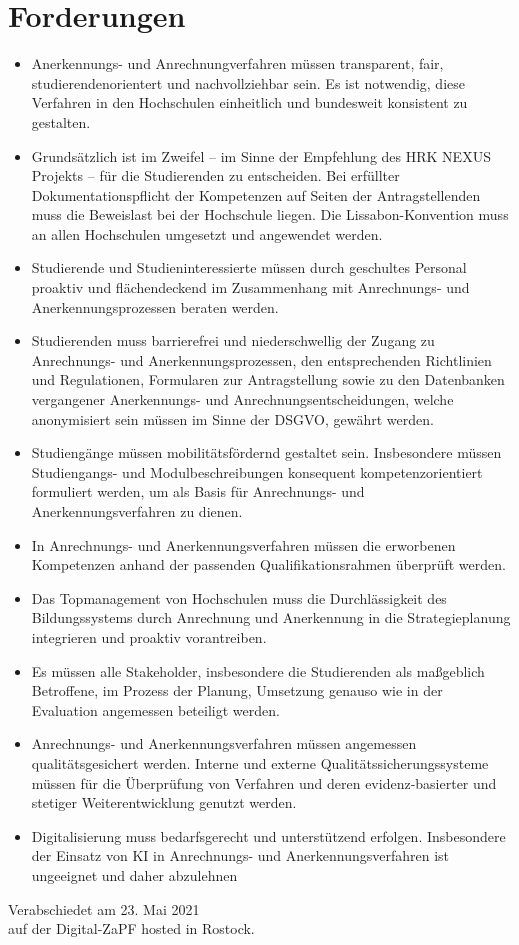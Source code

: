 \documentclass[DIV=calc]{scrartcl}
\begin{document}
\section*{Forderungen}

\begin{itemize}
    \item Anerkennungs- und Anrechnungverfahren müssen transparent, fair, studierendenorientert und nachvollziehbar sein. Es ist notwendig, diese Verfahren in den Hochschulen einheitlich und bundesweit konsistent zu gestalten.
    \item Grundsätzlich ist im Zweifel – im Sinne der Empfehlung des HRK NEXUS Projekts – für die Studierenden zu entscheiden. Bei erfüllter Dokumentationspflicht der Kompetenzen auf Seiten der Antragstellenden muss die Beweislast bei der Hochschule liegen. Die Lissabon-Konvention muss an allen Hochschulen umgesetzt und angewendet werden.
    \item Studierende und Studieninteressierte müssen durch geschultes Personal proaktiv und flächendeckend im Zusammenhang mit Anrechnungs- und Anerkennungsprozessen beraten werden.
    \item Studierenden muss barrierefrei und niederschwellig der Zugang zu Anrechnungs- und Anerkennungsprozessen, den entsprechenden Richtlinien und Regulationen, Formularen zur Antragstellung sowie zu den Datenbanken vergangener Anerkennungs- und Anrechnungsentscheidungen, welche anonymisiert sein müssen im Sinne der DSGVO, gewährt werden.
    \item Studiengänge müssen mobilitätsfördernd gestaltet sein. Insbesondere müssen Studiengangs- und Modulbeschreibungen konsequent kompetenzorientiert formuliert werden, um als Basis für Anrechnungs- und Anerkennungsverfahren zu dienen.
    \item In Anrechnungs- und Anerkennungsverfahren müssen die erworbenen Kompetenzen anhand der passenden Qualifikationsrahmen überprüft werden.
    \item Das Topmanagement von Hochschulen muss die Durchlässigkeit des Bildungssystems durch Anrechnung und Anerkennung in die Strategieplanung integrieren und proaktiv vorantreiben.
    \newpage
    \item Es müssen alle Stakeholder, insbesondere die Studierenden als maßgeblich Betroffene, im Prozess der Planung, Umsetzung genauso wie in der Evaluation angemessen beteiligt werden.
    \item Anrechnungs- und Anerkennungsverfahren müssen angemessen qualitätsgesichert werden. Interne und externe Qualitätssicherungssysteme müssen für die Überprüfung von Verfahren und deren evidenz-basierter und stetiger Weiterentwicklung genutzt werden.
    \item Digitalisierung muss bedarfsgerecht und unterstützend erfolgen. Insbesondere der Einsatz von KI in Anrechnungs- und Anerkennungsverfahren ist ungeeignet und daher abzulehnen
\end{itemize}

\vfill
\begin{flushright}
	Verabschiedet am 23. Mai 2021 \\
	auf der Digital-ZaPF hosted in Rostock.
\end{flushright}
\end{document}
